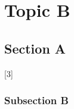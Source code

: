 \chapter{Topic B}\label{ch:maintopicb}
\blindmathtrue

\section{Section A}%
    \Blindtext
    [3]

\subsection{Subsection B}%
    \Blindtext
